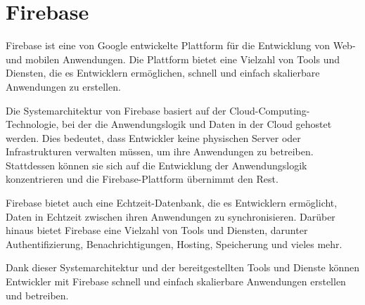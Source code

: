 




\section{Firebase}
Firebase\cite{firebase} ist eine von Google entwickelte Plattform für die Entwicklung von Web- und mobilen Anwendungen. Die Plattform bietet eine Vielzahl von Tools und Diensten, die es Entwicklern ermöglichen, schnell und einfach skalierbare Anwendungen zu erstellen.

Die Systemarchitektur von Firebase basiert auf der Cloud-Computing-Technologie, bei der die Anwendungslogik und Daten in der Cloud gehostet werden. Dies bedeutet, dass Entwickler keine physischen Server oder Infrastrukturen verwalten müssen, um ihre Anwendungen zu betreiben. Stattdessen können sie sich auf die Entwicklung der Anwendungslogik konzentrieren und die Firebase-Plattform übernimmt den Rest.

Firebase bietet auch eine Echtzeit-Datenbank, die es Entwicklern ermöglicht, Daten in Echtzeit zwischen ihren Anwendungen zu synchronisieren. Darüber hinaus bietet Firebase eine Vielzahl von Tools und Diensten, darunter Authentifizierung, Benachrichtigungen, Hosting, Speicherung und vieles mehr.

Dank dieser Systemarchitektur und der bereitgestellten Tools und Dienste können Entwickler mit Firebase schnell und einfach skalierbare Anwendungen erstellen und betreiben.

